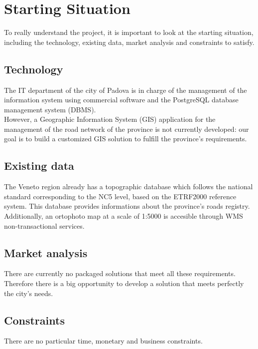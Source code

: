 \section{Starting Situation}
To really understand the project, it is important to look at the starting situation, including the technology, existing data, market analysis and constraints to satisfy.
\subsection{Technology}
The IT department of the city of Padova is in charge of the management of the information system using commercial software and the PostgreSQL database management system (DBMS).\\
However, a Geographic Information System (GIS) application for the management of the road network of the province is not currently developed: our goal is to build a customized GIS solution to fulfill the province’s requirements.
\subsection{Existing data}
The Veneto region already has a topographic database which follows the national standard corresponding to the NC5 level, based on the ETRF2000 reference system. This database provides informations about the province's roads registry.\\
Additionally, an ortophoto map at a scale of 1:5000 is accesible through WMS non-transactional services.
\subsection{Market analysis}
There are currently no packaged solutions that meet all these requirements. Therefore there is a big opportunity to develop a solution that meets perfectly the city's needs. 
\subsection{Constraints}
There are no particular time, monetary and business constraints.